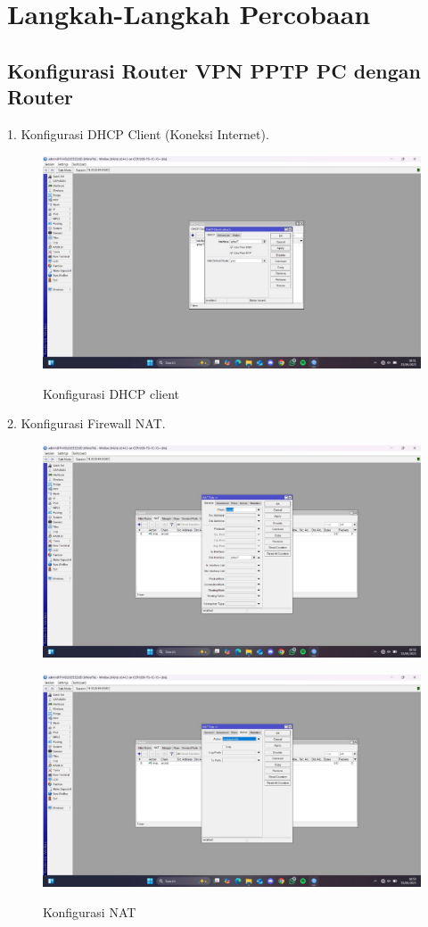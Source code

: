 \section{Langkah-Langkah Percobaan}
\subsection{Konfigurasi Router VPN PPTP PC dengan Router}
1. Konfigurasi DHCP Client (Koneksi Internet).
\begin{figure}[H]
    \centering
    \includegraphics[width=0.65\linewidth]{image/tun4.jpg}
    \label{fig:inirujukan}
    \caption{Konfigurasi DHCP client}
\end{figure}
2. Konfigurasi Firewall NAT.
\begin{figure}[H]
    \centering
    \includegraphics[width=0.65\linewidth]{image/tun5.jpg}
    \label{fig:inirujukan}
\end{figure}
\begin{figure}[H]
    \centering
    \includegraphics[width=0.65\linewidth]{image/tun6.jpg}
    \label{fig:inirujukan}
    \caption{Konfigurasi NAT}
\end{figure}

